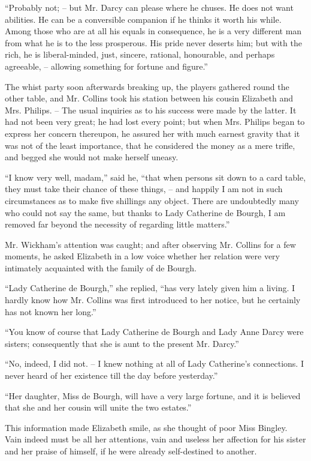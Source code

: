 “Probably not; -- but Mr. Darcy can please where he
chuses. He does not want abilities. He can be a conversible
companion if he thinks it worth his while. Among
those who are at all his equals in consequence, he is a very
different man from what he is to the less prosperous.
His pride never deserts him; but with the rich, he is
liberal-minded, just, sincere, rational, honourable, and
perhaps agreeable, -- allowing something for fortune and
figure.”

The whist party soon afterwards breaking up, the players
gathered round the other table, and Mr. Collins took his
station between his cousin Elizabeth and Mrs. Philips. -- The
usual inquiries as to his success were made by the latter.
It had not been very great; he had lost every point;
but when Mrs. Philips began to express her concern thereupon,
he assured her with much earnest gravity that it
was not of the least importance, that he considered the
money as a mere trifle, and begged she would not make
herself uneasy.

“I know very well, madam,” said he, “that when
persons sit down to a card table, they must take their
chance of these things, -- and happily I am not in such
circumstances as to make five shillings any object. There
are undoubtedly many who could not say the same, but
thanks to Lady Catherine de Bourgh, I am removed far
beyond the necessity of regarding little matters.”

Mr. Wickham’s attention was caught; and after observing
Mr. Collins for a few moments, he asked Elizabeth in
a low voice whether her relation were very intimately
acquainted with the family of de Bourgh.

“Lady Catherine de Bourgh,” she replied, “has very
lately given him a living. I hardly know how Mr. Collins
was first introduced to her notice, but he certainly has
not known her long.”

“You know of course that Lady Catherine de Bourgh
and Lady Anne Darcy were sisters; consequently that
she is aunt to the present Mr. Darcy.”

“No, indeed, I did not. -- I knew nothing at all of Lady
Catherine’s connections. I never heard of her existence
till the day before yesterday.”

“Her daughter, Miss de Bourgh, will have a very large
fortune, and it is believed that she and her cousin will
unite the two estates.”

This information made Elizabeth smile, as she thought
of poor Miss Bingley. Vain indeed must be all her attentions,
vain and useless her affection for his sister and her
praise of himself, if he were already self-destined to
another.

